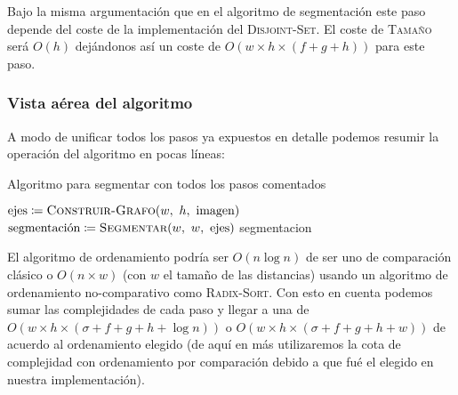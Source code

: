 Bajo la misma argumentación que en el algoritmo de segmentación este paso
depende del coste de la implementación del \textsc{Disjoint-Set}. El coste de
\textsc{Tamaño} será $O(h)$ dejándonos así un coste de $O(w \times h \times (f
+ g + h))$ para este paso.

\subsubsection{Vista aérea del algoritmo}

A modo de unificar todos los pasos ya expuestos en detalle podemos resumir la
operación del algoritmo en pocas líneas:

\begin{algorithm}[H]
\caption{Algoritmo para segmentar con todos los pasos comentados}
\begin{algorithmic}[1]
\Statex{}
	\State{} 
	\State{} $\text{ejes} \is \Call{Construir-Grafo}{w,\ h,\ \text{imagen}}$
	\State{} 
	\State{} $\text{segmentación} \is \Call{Segmentar}{w,\ w,\ \text{ejes}}$
	\State{} 
	\State{} \Return{} segmentacion
\EndFunction{}
\end{algorithmic}
\end{algorithm}

El algoritmo de ordenamiento podría ser $O(n \log n)$ de ser uno de comparación
clásico o $O(n \times w)$ (con $w$ el tamaño de las distancias) usando un
algoritmo de ordenamiento no-comparativo como \textsc{Radix-Sort}.  Con esto en
cuenta podemos sumar las complejidades de cada paso y llegar a una de $O(w
\times h \times (\sigma + f + g + h + \log n))$ o $O(w \times h \times (\sigma
+ f + g + h + w))$ de acuerdo al ordenamiento elegido (de aquí en más
utilizaremos la cota de complejidad con ordenamiento por comparación debido a
que fué el elegido en nuestra implementación).
